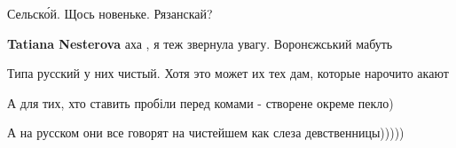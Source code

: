 \begin{itemize}
\begin{itemize}
\end{itemize}

 
Сельско́й. Щось новеньке. Рязанскай?

\begin{itemize}
 
\textbf{Tatiana Nesterova} аха , я теж звернула увагу. Воронєжський мабуть
\end{itemize}

 
Типа русский у них чистый. Хотя это может их тех дам, которые нарочито акают

 
А для тих, хто ставить пробіли перед комами - створене окреме пекло)

 
А на русском они все говорят на чистейшем как слеза девственницы)))))

\begin{itemize}
 

\end{itemize}
\end{itemize}
